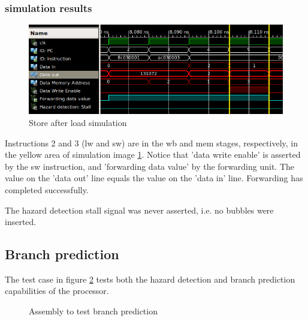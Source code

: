 \subsubsection*{simulation results}

\begin{figure}[H]
  \begin{center}
    \includegraphics[width=\textwidth]{assets/lw-sw-forwarding.png}
  \end{center}
  \caption{
    Store after load simulation}
  \label{fig:simulate_lw_sw}
\end{figure}

Instructions 2 and 3 (lw and sw) are in the wb and mem stages, respectively, in the yellow area of simulation image \ref{fig:simulate_lw_sw}.
Notice that 'data write enable' is asserted by the sw instruction, and 'forwarding data value' by the forwarding unit.
The value on the 'data out' line equals the value on the 'data in' line. Forwarding has completed successfully.

The hazard detection stall signal was never asserted, i.e. no bubbles were inserted.

\subsection{Branch prediction}

The test case in figure \ref{fig:test-branch-prediction} tests both the hazard detection and branch prediction capabilities of the processor.

\begin{figure}[H]
  \caption{Assembly to test branch prediction} \label{fig:test-branch-prediction}
\end{figure}

